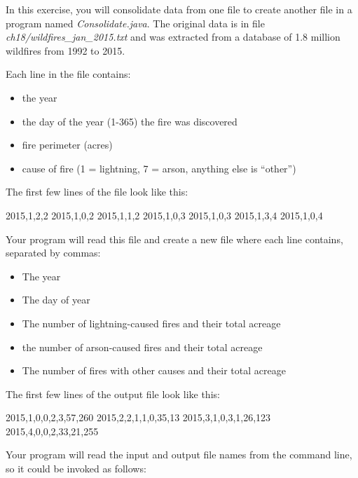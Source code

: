 \begin{exercise}
In this exercise, you will consolidate data from one file to create another file in a program named {\em Consolidate.java}. The original data is in file {\em ch18/wildfires\_jan\_2015.txt} and was extracted from a database of 1.8 million wildfires from 1992 to 2015.\footnotemark


Each line in the file contains:
\begin{itemize}
\item the year
\item the day of the year (1-365) the fire was discovered
\item fire perimeter (acres)
\item cause of fire (1 = lightning, 7 = arson, anything else is ``other'')
\end{itemize}

The first few lines of the file look like this:

\begin{stdout}
2015,1,2,2
2015,1,0,2
2015,1,1,2
2015,1,0,3
2015,1,0,3
2015,1,3,4
2015,1,0,4
\end{stdout}

Your program will read this file and create a new file where each line contains, separated by commas:

\begin{itemize}
\item The year
\item The day of year
\item The number of lightning-caused fires and their total acreage
\item the number of arson-caused fires and their total acreage
\item The number of fires with other causes and their total acreage
\end{itemize}

The first few lines of the output file look like this:

\begin{stdout}
2015,1,0,0,2,3,57,260
2015,2,2,1,1,0,35,13
2015,3,1,0,3,1,26,123
2015,4,0,0,2,33,21,255
\end{stdout}

Your program will read the input and output file names from the command line, so it could be invoked as follows:


\end{exercise}
